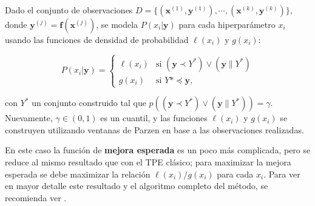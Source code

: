 Dado el conjunto de observaciones $D = \{(\textbf{x}^{(1)},\textbf{y}^{(1)}), \cdots, (\textbf{x}^{(k)},\textbf{y}^{(k)}) \}$, donde $\textbf{y}^{(j)} = \textbf{f}(\textbf{x}^{(j)})$, se modela $P(x_i|\textbf{y})$ para cada hiperparámetro $x_i$ usando las funciones de densidad de probabilidad $\ell(x_i)$ y $g(x_i)$:


\begin{equation}
\label{eq:motpe}
P(x_i|\textbf{y}) =
	\begin{cases}
		\ell (x_i) & \text{si } (\textbf{y} \prec Y^*) \vee (\textbf{y} \| Y^*) \\
		g(x_i) & \text{si } Y* \preceq \textbf{y},
	\end{cases}
\end{equation}

con $Y^*$ un conjunto construido tal que $p((\textbf{y} \prec Y^*) \vee (\textbf{y} \| Y^*)) = \gamma$. Nuevamente, $\gamma \in (0,1)$ es un cuantil, y las funciones $\ell(x_i)$ y $g(x_i)$ se construyen utilizando ventanas de Parzen en base a las observaciones realizadas.

En este caso la función de \textbf{mejora esperada} es un poco más complicada, pero se reduce al mismo resultado que con el TPE clásico; para maximizar la mejora esperada se debe maximizar la relación $\ell(x_i)/g(x_i)$ para cada $x_i$. Para ver en mayor detalle este resultado y el algoritmo completo del método, se recomienda ver \cite{10.1613/jair.1.13188}.





